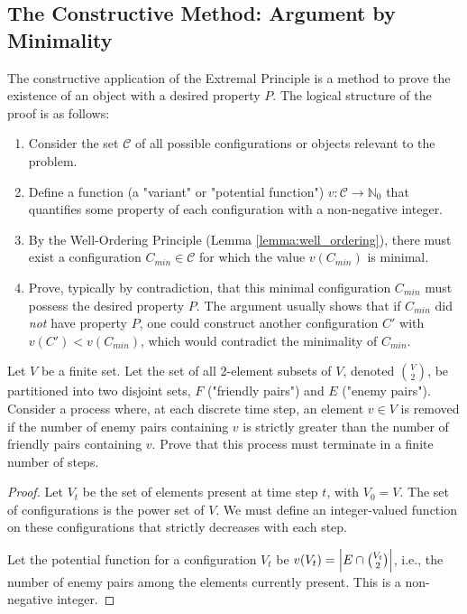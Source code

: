\begin{theorem}
\subsection{The Constructive Method: Argument by Minimality}

The constructive application of the Extremal Principle is a method to prove the existence of an object with a desired property $P$. The logical structure of the proof is as follows:
\begin{enumerate}
    \item Consider the set $\mathcal{C}$ of all possible configurations or objects relevant to the problem.
    \item Define a function (a "variant" or "potential function") $v: \mathcal{C} \to \mathbb{N}_0$ that quantifies some property of each configuration with a non-negative integer.
    \item By the Well-Ordering Principle (Lemma \ref{lemma:well_ordering}), there must exist a configuration $C_{min} \in \mathcal{C}$ for which the value $v(C_{min})$ is minimal.
    \item Prove, typically by contradiction, that this minimal configuration $C_{min}$ must possess the desired property $P$. The argument usually shows that if $C_{min}$ did \textit{not} have property $P$, one could construct another configuration $C'$ with $v(C') < v(C_{min})$, which would contradict the minimality of $C_{min}$.
\end{enumerate}

\begin{proposition}
Let $V$ be a finite set. Let the set of all 2-element subsets of $V$, denoted $\binom{V}{2}$, be partitioned into two disjoint sets, $F$ ("friendly pairs") and $E$ ("enemy pairs"). Consider a process where, at each discrete time step, an element $v \in V$ is removed if the number of enemy pairs containing $v$ is strictly greater than the number of friendly pairs containing $v$. Prove that this process must terminate in a finite number of steps.
\end{proposition}
\begin{proof}
Let $V_t$ be the set of elements present at time step $t$, with $V_0 = V$. The set of configurations is the power set of $V$. We must define an integer-valued function on these configurations that strictly decreases with each step.

Let the potential function for a configuration $V_t$ be $v(V_t) = \left| E \cap \binom{V_t}{2} \right|$, i.e., the number of enemy pairs among the elements currently present. This is a non-negative integer.


\end{proof}
\end{theorem}
